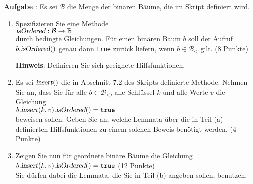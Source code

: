 \documentclass{article}
\newcounter{aufgabe}
\newcommand{\exercise}{\vspace*{0.2cm}
\stepcounter{aufgabe}

\noindent
\textbf{Aufgabe \arabic{aufgabe}}: }
\begin{document}
\exercise
Es sei $\mathcal{B}$ die Menge der bin\"aren B\"aume, die im Skript definiert wird.  
\begin{enumerate}
\item Spezifizieren Sie eine Methode \\[0.2cm]
      \hspace*{1.3cm}
      $\textsl{isOrdered}: \mathcal{B} \rightarrow \mathbb{B}$
      \\[0.2cm]
      durch bedingte Gleichungen.  F\"ur einen bin\"aren Baum $b$ soll der Aufruf
      $b.\textsl{isOrdered}()$ genau dann \texttt{true} zur\"uck liefern, wenn $b\in \mathcal{B}_<$
      gilt.
      \hspace*{\fill} (8 Punkte)

      \textbf{Hinweis}: Definieren Sie sich geeignete Hilfsfunktionen.
\item Es sei $\textsl{insert}()$ die in Abschnitt 7.2 des Skripts definierte Methode.
      Nehmen Sie an, dass Sie f\"ur alle $b\in \mathcal{B}_<$, alle Schl\"ussel $k$ und alle Werte
      $v$ die Gleichung
      \\[0.2cm]
      \hspace*{1.3cm} $b.\textsl{insert}(k,v).\textsl{isOrdered}() = \texttt{true}$
      \\[0.2cm]
      beweisen sollen.  Geben Sie an, welche Lemmata \"uber die in Teil (a) definierten
      Hilfsfunktionen zu einem solchen Beweis ben\"otigt werden.
      \hspace*{\fill} (4 Punkte)
\item Zeigen Sie nun f\"ur geordnete bin\"are B\"aume die Gleichung
      \\[0.2cm]
      \hspace*{1.3cm} $b.\textsl{insert}(k,v).\textsl{isOrdered}() = \texttt{true}$ 
      \hspace*{\fill} (12 Punkte)
      \\[0.2cm]
      Sie d\"urfen dabei die Lemmata, die Sie in Teil (b) angeben sollen, benutzen.
\end{enumerate}
\end{document}
